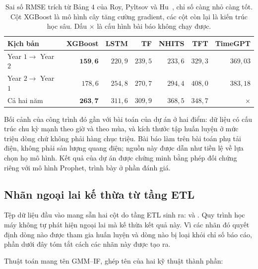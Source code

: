 \begin{table}[htbp]
\centering

\small
\begin{tabular}{@{}l r r r r r r@{}}
\toprule
\textbf{Kịch bản} & \textbf{XGBoost} & \textbf{LSTM} & \textbf{TF} & \textbf{NHITS} &
\textbf{TFT} & \textbf{TimeGPT} \\
\midrule
Year $1 \rightarrow$ Year $2$ & $\mathbf{159{,}6}$ & $220{,}9$ & $239{,}5$ & $233{,}6$ & $329{,}3$ & $369{,}03$ \\
Year $2 \rightarrow$ Year $1$ & $178{,}6$ & $254{,}8$ & $270{,}7$ & $294{,}4$ & $408{,}0$ & $383{,}18$ \\
Cả hai năm                    & $\mathbf{263{,}7}$ & $311{,}6$ & $309{,}9$ & $368{,}5$ & $348{,}7$ & $\times$ \\
\bottomrule
\end{tabular}
\caption[Sai số RMSE trích từ Bảng $4$ của Roy, Pyltsov và Hu, chỉ số càng nhỏ càng tốt]{Sai số RMSE trích từ Bảng $4$ của Roy, Pyltsov và Hu~\cite{roy2025hourly}, chỉ số
càng nhỏ càng tốt. Cột XGBoost là mô hình cây tăng cường gradient, các cột còn lại là kiến
trúc học sâu. Dấu $\times$ là cấu hình bài báo không chạy được.}
\label{tab:roy_rmse}
\end{table}


Bối cảnh của công trình đó gần với bài toán của dự án ở hai điểm: dữ liệu có cấu trúc
chu kỳ mạnh theo giờ và theo mùa, và kích thước tập huấn luyện ở mức triệu dòng chứ không
phải hàng chục triệu. Bài báo
làm trên bài toán phụ tải điện, không phải sản lượng quang điện; nguồn này được dẫn
như tiền lệ về lựa chọn họ mô hình. Kết quả của dự án được
chứng minh bằng phép đối chứng riêng với mô hình Prophet, trình bày ở phần đánh giá.

\FloatBarrier
\subsection{Nhãn ngoại lai kế thừa từ tầng ETL}

Tệp dữ liệu đầu vào mang sẵn hai cột do tầng ETL sinh ra:
 và . Quy trình học máy không tự
phát hiện ngoại lai mà kế thừa kết quả này. Vì các nhãn đó quyết định dòng
nào được tham gia huấn luyện và dòng nào bị loại khỏi chỉ số báo cáo, phần dưới đây tóm
tắt cách các nhãn này được tạo ra.

Thuật toán mang tên GMM--IF, ghép tên của hai kỹ thuật thành phần:

